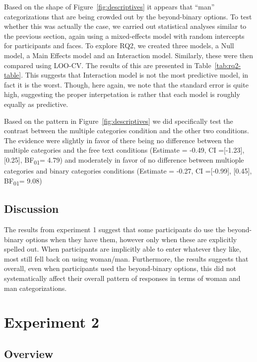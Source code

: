 \documentclass[
  man]{apa7}
\begin{document}
Based on the shape of Figure~\ref{fig:descriptives} it appears that ``man'' categorizations that are being crowded out by the beyond-binary options. To test whether this was actually the case, we carried out statistical analyses similar to the previous section, again using a mixed-effects model with random intercepts for participants and faces. To explore RQ2, we created three models, a Null model, a Main Effects model and an Interaction model. Similarly, these were then compared using LOO-CV. The results of this are presented in Table~\ref{tab:rq2-table}. This suggests that Interaction model is not the most predictive model, in fact it is the worst. Though, here again, we note that the standard error is quite high, suggesting the proper interpetation is rather that each model is roughly equally as predictive.

Based on the pattern in Figure~\ref{fig:descriptives} we did specifically test the contrast between the multiple categories condition and the other two conditions. The evidence were slightly in favor of there being no difference between the multiple categories and the free text conditions (Estimate = -0.49, CI ={[}-1.23{]}, {[}0.25{]}, BF\textsubscript{01}= 4.79) and moderately in favor of no difference between multiople categories and binary categories conditions (Estimate = -0.27, CI ={[}-0.99{]}, {[}0.45{]}, BF\textsubscript{01}= 9.08)

\hypertarget{discussion}{%
\subsection{Discussion}\label{discussion}}

The results from experiment 1 suggest that some participants do use the beyond-binary options when they have them, however only when these are explicitly spelled out. When participants are implicitly able to enter whatever they like, most still fell back on using woman/man. Furthermore, the results suggests that overall, even when participants used the beyond-binary options, this did not systematically affect their overall pattern of responses in terms of woman and man categorizations.

\hypertarget{experiment-2}{%
\section{Experiment 2}\label{experiment-2}}

\hypertarget{overview-1}{%
\subsection{Overview}\label{overview-1}}
\end{document}
